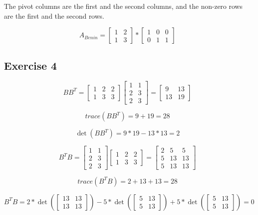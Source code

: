 \documentclass{article}
\begin{document}
The pivot columns are the first and the second columns, and the non-zero rows are the first and the second rows.

\[A_{Benin} =
    \begin{bmatrix}
        1 & 2 \\
        1 & 3
    \end{bmatrix}
    *
    \begin{bmatrix}
        1 & 0 & 0 \\
        0 & 1 & 1
    \end{bmatrix}
\]

\subsection{Exercise 4}
\[
    BB^{T} =
    \begin{bmatrix}
        1 & 2 & 2 \\
        1 & 3 & 3
    \end{bmatrix}
    \begin{bmatrix}
        1 & 1 \\
        2 & 3 \\
        2 & 3
    \end{bmatrix}
    = \begin{bmatrix}
        9  & 13 \\
        13 & 19
    \end{bmatrix}
\]

\[
    trace(BB^{T}) = 9 + 19 = 28
\]

\[
    \det(BB^{T}) = 9 * 19 - 13 * 13 = 2
\]

\[
    B^{T}B =
    \begin{bmatrix}
        1 & 1 \\
        2 & 3 \\
        2 & 3
    \end{bmatrix}
    \begin{bmatrix}
        1 & 2 & 2 \\
        1 & 3 & 3
    \end{bmatrix}
    = \begin{bmatrix}
        2 & 5  & 5  \\
        5 & 13 & 13 \\
        5 & 13 & 13
    \end{bmatrix}
\]

\[
    trace(B^{T}B) = 2 + 13 + 13 = 28
\]

\[
    B^{T}B = 2 * \det(\begin{bmatrix} 13 & 13 \\ 13 & 13 \end{bmatrix}) - 5 * \det(\begin{bmatrix} 5 & 13 \\ 5 & 13 \end{bmatrix}) + 5 * \det(\begin{bmatrix} 5 & 13 \\ 5 & 13 \end{bmatrix}) = 0
\]
\end{document}
